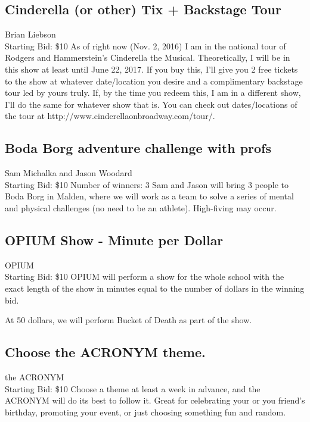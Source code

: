 \documentclass[11pt]{article}
\begin{document}
\subsection{Cinderella (or other) Tix + Backstage Tour}
Brian Liebson
\\
Starting Bid: \$10
\newline
As of right now (Nov. 2, 2016) I am in the national tour of Rodgers and Hammerstein's Cinderella the Musical. Theoretically, I will be in this show at least until June 22, 2017. If you buy this, I'll give you 2 free tickets to the show at whatever date/location you desire and a complimentary backstage tour led by yours truly. If, by the time you redeem this, I am in a different show, I'll do the same for whatever show that is. You can check out dates/locations of the tour at http://www.cinderellaonbroadway.com/tour/.
\subsection{Boda Borg adventure challenge with profs}
Sam Michalka and Jason Woodard
\\
Starting Bid: \$10
\newline
Number of winners: 3
\newline
Sam and Jason will bring 3 people to Boda Borg in Malden, where we will work as a team to solve a series of mental and physical challenges (no need to be an athlete).  High-fiving may occur.
\subsection{OPIUM Show - Minute per Dollar}
OPIUM
\\
Starting Bid: \$10
\newline
OPIUM will perform a show for the whole school with the exact length of the show in minutes equal to the number of dollars in the winning bid.

At 50 dollars, we will perform Bucket of Death as part of the show.
\subsection{Choose the ACRONYM theme.}
the ACRONYM
\\
Starting Bid: \$10
\newline
Choose a theme at least a week in advance, and the ACRONYM will do its best to follow it. Great for celebrating your or you friend's birthday, promoting your event, or just choosing something fun and random.
\end{document}
